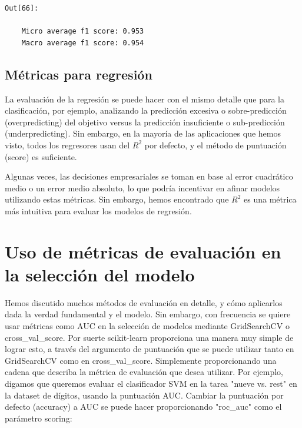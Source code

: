 {\begin{lstlisting}
Out[66]:

    Micro average f1 score: 0.953
    Macro average f1 score: 0.954

\end{lstlisting}




\subsection{Métricas para  regresión}


La evaluación de la regresión se puede hacer con el mismo detalle que para la clasificación, por ejemplo,  analizando la predicción excesiva  o sobre-predicción (overpredicting) del objetivo versus la predicción insuficiente o sub-predicción (underpredicting).  Sin embargo, en la mayoría de las aplicaciones   que hemos visto, todos los regresores   usan  del  $R^{2}$  por defecto, y  el método de puntuación (score) es suficiente.

Algunas veces, las decisiones empresariales se toman en base al  error cuadrático medio o un error medio absoluto, lo que podría incentivar en afinar modelos utilizando estas métricas. Sin embargo, hemos encontrado que $R^{2}$ es una métrica más intuitiva para evaluar los modelos de regresión.





\section{Uso de métricas de evaluación en la selección del modelo}



Hemos discutido muchos métodos de evaluación en detalle, y cómo aplicarlos dada la verdad fundamental y el modelo. Sin embargo, con frecuencia se quiere usar métricas como AUC en la selección de modelos mediante  {\ttfamily GridSearchCV} o {\ttfamily cross\_val\_score}. Por suerte {\ttfamily  scikit-learn} proporciona una manera muy simple de lograr esto, a través del argumento de puntuación que se puede utilizar tanto en {\ttfamily GridSearchCV} como en {\ttfamily cross\_val\_score}.   Simplemente  proporcionando una cadena que describa la métrica de evaluación que desea utilizar. Por ejemplo,  digamos  que queremos evaluar el clasificador SVM en la tarea "{}nueve vs. rest"{} en la dataset de dígitos, usando la puntuación AUC.   Cambiar la puntuación por defecto  (accuracy) a AUC se puede hacer proporcionando "{}{\ttfamily roc\_auc}"{} como el parámetro {\ttfamily scoring}: 
 
}
